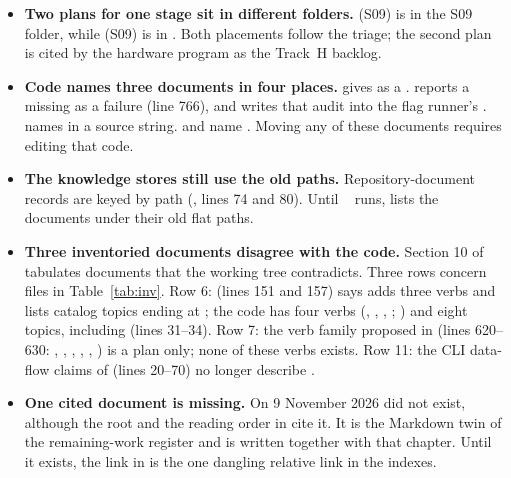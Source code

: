 \begin{itemize}
  \item \textbf{Two plans for one stage sit in different folders.}  (S09) is in the S09 folder, while  (S09) is in . Both placements follow the triage; the second plan is cited by the hardware program as the Track~H backlog.
  \item \textbf{Code names three documents in four places.}  gives  as a .  reports a missing  as a failure (line 766), and  writes that audit into the flag runner's .  names  in a source string.  and  name . Moving any of these documents requires editing that code.
  \item \textbf{The knowledge stores still use the old paths.} Repository-document records are keyed by path (, lines 74 and 80). Until ~ runs,  lists the documents under their old flat paths.
  \item \textbf{Three inventoried documents disagree with the code.} Section 10 of  tabulates documents that the working tree contradicts. Three rows concern files in Table~\ref{tab:inv}. Row 6:  (lines 151 and 157) says  adds three verbs and lists catalog topics ending at ; the code has four verbs (, , , ; ) and eight topics, including  (lines 31--34). Row 7: the verb family proposed in  (lines 620--630: , , , , , ) is a plan only; none of these verbs exists. Row 11: the CLI data-flow claims of  (lines 20--70) no longer describe .
  \item \textbf{One cited document is missing.} On 9 November 2026  did not exist, although the root  and the reading order in  cite it. It is the Markdown twin of the remaining-work register and is written together with that chapter. Until it exists, the link in  is the one dangling relative link in the  indexes.

\end{itemize}
